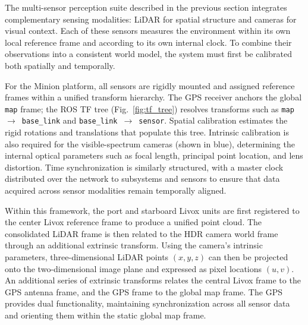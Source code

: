 \documentclass{erauthesis}
\begin{document}
The multi-sensor perception suite described in the previous section integrates complementary sensing modalities: \ac{LiDAR} for spatial structure and cameras for visual context.
Each of these sensors measures the environment within its own local reference frame and according to its own internal clock.
To combine their observations into a consistent world model, the system must first be calibrated both spatially and temporally.

For the Minion platform, all sensors are rigidly mounted and assigned reference frames within a unified transform hierarchy. 
The GPS receiver anchors the global \texttt{map} frame; the ROS TF tree (Fig.~\ref{fig:tf_tree}) resolves transforms such as \texttt{map}\ $\rightarrow$\ \texttt{base\_link} and \texttt{base\_link}\ $\rightarrow$\ \texttt{sensor}. Spatial calibration estimates the rigid rotations and translations that populate this tree.  
Intrinsic calibration is also required for the visible-spectrum cameras (shown in blue), determining the internal optical parameters such as focal length, principal point location, and lens distortion. 
Time synchronization is similarly structured, with a master clock distributed over the network to subsystems and sensors to ensure that data acquired across sensor modalities remain temporally aligned.

Within this framework, the port and starboard Livox units are first registered to the center Livox reference frame to produce a unified point cloud. 
The consolidated LiDAR frame is then related to the HDR camera world frame through an additional extrinsic transform. 
Using the camera’s intrinsic parameters, three-dimensional LiDAR points $(x, y, z)$ can then be projected onto the two-dimensional image plane and expressed as pixel locations $(u, v)$. 
An additional series of extrinsic transforms relates the central Livox frame to the \ac{GPS} antenna frame, and the \ac{GPS} frame to the global map frame. 
The \ac{GPS} provides dual functionality, maintaining synchronization across all sensor data and orienting them within the static global map frame.
\end{document}
